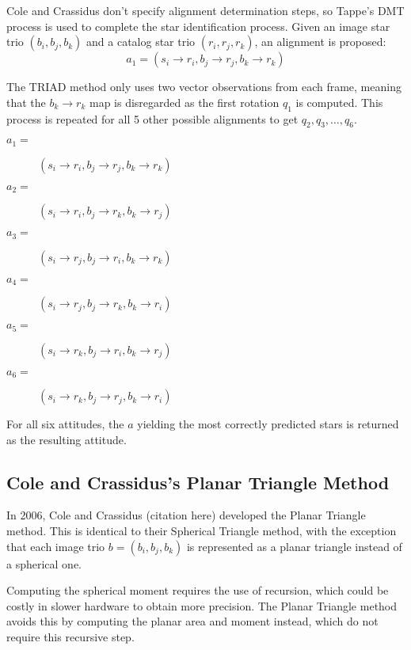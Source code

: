 Cole and Crassidus don't specify alignment determination steps, so Tappe's DMT process is used to complete the star
identification process. Given an image star trio $(b_i, b_j, b_k)$ and a catalog star trio $(r_i, r_j, r_k)$, an
alignment is proposed:
\begin{equation}
    a_1 = (s_i \rightarrow r_i, b_j \rightarrow r_j, b_k \rightarrow r_k)
\end{equation}

The TRIAD method only uses two vector observations from each frame, meaning that the $b_k \rightarrow r_k$ map is
disregarded as the first rotation $q_1$ is computed. This process is repeated for all 5 other possible alignments to
get $q_2, q_3, \dots, q_6$.
\begin{description}
    \item [$a_1 = $] $(s_i \rightarrow r_i, b_j \rightarrow r_j, b_k \rightarrow r_k)$
    \item [$a_2 = $] $(s_i \rightarrow r_i, b_j \rightarrow r_k, b_k \rightarrow r_j)$
    \item [$a_3 = $] $(s_i \rightarrow r_j, b_j \rightarrow r_i, b_k \rightarrow r_k)$
    \item [$a_4 = $] $(s_i \rightarrow r_j, b_j \rightarrow r_k, b_k \rightarrow r_i)$
    \item [$a_5 = $] $(s_i \rightarrow r_k, b_j \rightarrow r_i, b_k \rightarrow r_j)$
    \item [$a_6 = $] $(s_i \rightarrow r_k, b_j \rightarrow r_j, b_k \rightarrow r_i)$
\end{description}

For all six attitudes, the $a$ yielding the most correctly predicted stars is returned as the resulting attitude.

\subsection{Cole and Crassidus's Planar Triangle Method}\label{subsec:coleAndCrassidus'sPlanarTriangleMethod}
In 2006, Cole and Crassidus (citation here) developed the Planar Triangle method. This is identical to their Spherical
Triangle method, with the exception that each image trio $b = (b_i, b_j, b_k)$ is represented as a planar triangle
instead of a spherical one.

Computing the spherical moment requires the use of recursion, which could be costly in slower hardware to obtain more
precision. The Planar Triangle method avoids this by computing the planar area and moment instead, which do not require
this recursive step.

